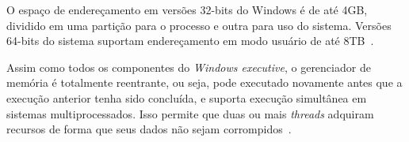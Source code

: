 	O espaço de endereçamento em versões 32-bits do Windows é de até 4GB, dividido em uma partição para o processo e outra para uso do sistema. Versões 64-bits do sistema suportam endereçamento em modo usuário de até 8TB~\cite{w10_memory}.
	
	Assim como todos os componentes do \emph{Windows executive}, o gerenciador de memória é totalmente reentrante, ou seja, pode executado novamente antes que a execução anterior tenha sido concluída, e suporta execução simultânea em sistemas multiprocessados. Isso permite que duas ou mais \emph{threads} adquiram recursos de forma que seus dados não sejam corrompidos~\cite{internals_pt2}.